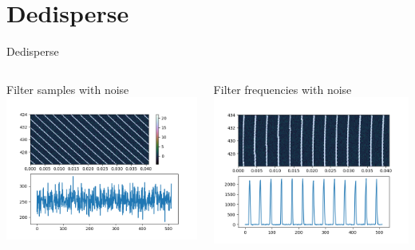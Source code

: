 \documentclass{beamer}
\begin{document}
\section{Dedisperse}
\begin{frame}{Dedisperse}
	\begin{columns}
		\begin{column}{0.5\textwidth}
			Filter samples with noise
			\includegraphics[width=\columnwidth]{dispersed_samples}
		\end{column}
		\begin{column}{0.5\textwidth}
			Filter frequencies with noise
			\includegraphics[width=\columnwidth]{dedispersed_samples}
		\end{column}
	\end{columns}
\end{frame}
\end{document}
